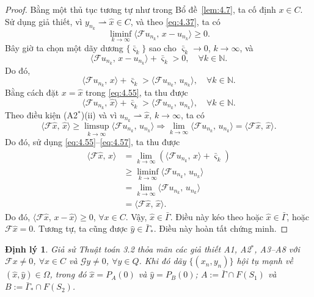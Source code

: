 \documentclass{MyBook}
\theoremstyle{plain}
\newtheorem{theorem}{Định lý}[chapter]
\theoremstyle{definition}
\theoremstyle{remark}
\numberwithin{equation}{chapter}
\newcommand{\Fc}{\mathcal{F}}
\newcommand{\Gc}{\mathcal{G}}
\newcommand{\inp}[2]{\langle #1,\,#2\rangle}
\newcommand{\wto}{\rightharpoonup}
\newcommand{\N}{\mathbb{N}}
\newcommand{\Gam}{\bar{\Gamma}}
\newcommand{\Gams}{\bar{\Gamma}_{*}}
\newcommand{\Fix}[1]{F(#1)}
\begin{document}
\begin{proof}
Bằng một thủ tục tương tự như trong Bổ đề~\ref{lem:4.7}, ta cố định $x\in C$. Sử dụng giả thiết, vì $y_{n_k}\wto\hat{x}\in C$, và theo \eqref{eq:4.37}, ta có
\[
\liminf_{k\to\infty}\inp{\Fc u_{n_k}}{x-u_{n_k}}\ge 0.
\]
Bây giờ ta chọn một dãy dương $\{\bar{\varsigma}_k\}$ sao cho $\bar{\varsigma}_k\to 0$, $k\to\infty$, và
\[
\inp{\Fc u_{n_k}}{x-u_{n_k}}+\bar{\varsigma}_k>0,\quad\forall k\in\N.
\]
Do đó,
\begin{equation}
\inp{\Fc u_{n_k}}{x}+\bar{\varsigma}_k>\inp{\Fc u_{n_k}}{u_{n_k}},\quad\forall k\in\N. \label{eq:4.55}
\end{equation}
Bằng cách đặt $x=\hat{x}$ trong \eqref{eq:4.55}, ta thu được
\begin{equation}
\inp{\Fc u_{n_k}}{\hat{x}}+\bar{\varsigma}_k>\inp{\Fc u_{n_k}}{u_{n_k}},\quad\forall k\in\N. \label{eq:4.56}
\end{equation}
Theo điều kiện (A2$^{*}$)(ii) và vì $u_{n_k}\wto\hat{x}$, $k\to\infty$, ta có
\begin{equation}
\inp{\Fc\hat{x}}{\hat{x}}\ge\limsup_{k\to\infty}\inp{\Fc u_{n_k}}{u_{n_k}}\Longrightarrow\lim_{k\to\infty}\inp{\Fc u_{n_k}}{u_{n_k}}=\inp{\Fc\hat{x}}{\hat{x}}. \label{eq:4.57}
\end{equation}
Do đó, sử dụng \eqref{eq:4.55}--\eqref{eq:4.57}, ta thu được
\begin{align*}
\inp{\Fc\hat{x}}{x} &= \lim_{k\to\infty}(\inp{\Fc u_{n_k}}{x}+\bar{\varsigma}_k)\\
&\ge \liminf_{k\to\infty}\inp{\Fc u_{n_k}}{u_{n_k}}\\
&= \lim_{k\to\infty}\inp{\Fc u_{n_k}}{u_{n_k}}\\
&= \inp{\Fc\hat{x}}{\hat{x}}.
\end{align*}
Do đó, $\inp{\Fc\hat{x}}{x-\hat{x}}\ge 0$, $\forall x\in C$. Vậy, $\hat{x}\in\Gam$. Điều này kéo theo hoặc $\hat{x}\in\Gam$, hoặc $\Fc\hat{x}=0$. Tương tự, ta cũng được $\hat{y}\in\Gams$. Điều này hoàn tất chứng minh.
\end{proof}

\begin{theorem}\label{thm:4.12}
Giả sử Thuật toán 3.2 thỏa mãn các giả thiết A1, A2$^{*}$, A3--A8 với $\Fc x\ne 0$, $\forall x\in C$ và $\Gc y\ne 0$, $\forall y\in Q$. Khi đó dãy $\{(x_n,y_n)\}$ hội tụ mạnh về $(\hat{x},\hat{y})\in\Omega$, trong đó $\hat{x}=P_A(0)$ và $\hat{y}=P_B(0)$; $A:=\Gam\cap \Fix{S_1}$ và $B:=\Gams\cap \Fix{S_2}$.
\end{theorem}
\end{document}

